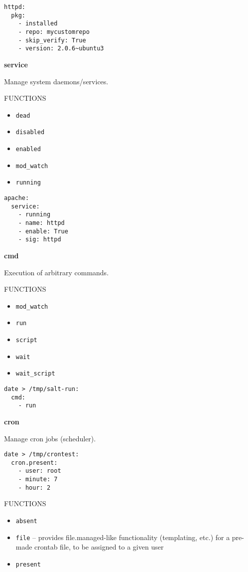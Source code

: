 \documentclass[landscape,a4paper,10pt]{article}
\begin{document}
\begin{multicols}{3}
\begin{verbatim}
httpd:
  pkg:
    - installed
    - repo: mycustomrepo
    - skip_verify: True
    - version: 2.0.6~ubuntu3
\end{verbatim}

\bfseries{\LARGE{service}}

Manage system daemons/services.

FUNCTIONS

\begin{itemize}
  \item \texttt{dead}
  \item \texttt{disabled}
  \item \texttt{enabled}
  \item \texttt{mod\_watch}
  \item \texttt{running}
\end{itemize}

\begin{verbatim}
apache:
  service:
    - running
    - name: httpd
    - enable: True
    - sig: httpd
\end{verbatim}


\bfseries{\LARGE{cmd}}

Execution of arbitrary commands.

FUNCTIONS

\begin{itemize}
  \item \texttt{mod\_watch}
  \item \texttt{run}
  \item \texttt{script}
  \item \texttt{wait}
  \item \texttt{wait\_script}
\end{itemize}

\begin{verbatim}
date > /tmp/salt-run:
  cmd:
    - run
\end{verbatim}

\bfseries{\LARGE{cron}}

Manage cron jobs (scheduler).

\begin{verbatim}
date > /tmp/crontest:
  cron.present:
    - user: root
    - minute: 7
    - hour: 2
\end{verbatim}

FUNCTIONS

\begin{itemize}
 \item \texttt{absent}
 \item \texttt{file} -- provides file.managed-like functionality (templating, etc.) for a pre-made crontab file, to be assigned to a given user
 \item \texttt{present}
\end{itemize}


\end{multicols}
\end{document}
